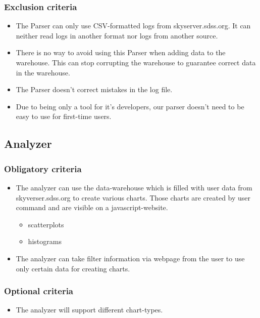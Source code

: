 \subsubsection{Exclusion criteria}
\begin{itemize}
\item The Parser can only use CSV-formatted logs from skyserver.sdss.org. 
It can neither read logs in another format nor logs
from another source.
\item There is no way to avoid using this Parser when adding data to the warehouse. 
This can stop corrupting the warehouse to guarantee correct data in the warehouse.
\item The Parser doesn't correct mistakes in the log file.
\item Due to being only a tool for it's developers, our parser doesn't need to be easy to use for first-time users.
\end{itemize}



\subsection{Analyzer}

\subsubsection{Obligatory criteria}
\begin{itemize}
\item The analyzer can use the data-warehouse which is filled with user data  
from skyverser.sdss.org to create various charts. 
Those charts are created by user command and are visible on a javascript-website.
\begin{itemize}
\item scatterplots
\item histograms
\end{itemize}
\item The analyzer can take filter information via webpage from the user to use only certain data for creating charts.
\end{itemize}

\subsubsection{Optional criteria}
\begin{itemize}
\item The analyzer will support different chart-types.
\end{itemize}

